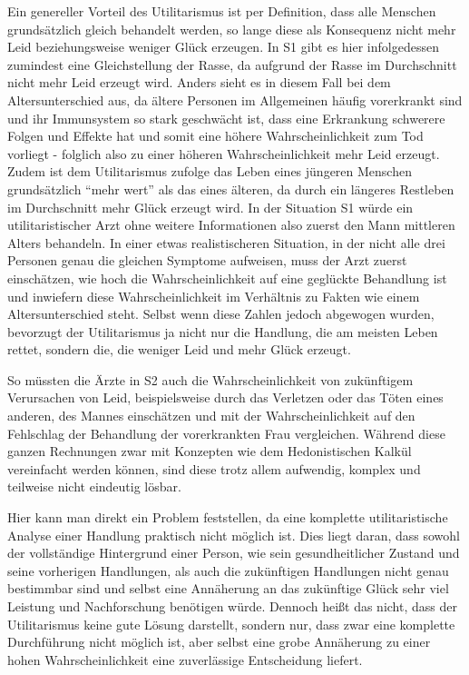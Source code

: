 \documentclass[a4paper]{article}
\begin{document}
Ein genereller Vorteil des Utilitarismus ist per Definition, dass alle Menschen grundsätzlich gleich behandelt werden, so lange diese als Konsequenz nicht mehr Leid beziehungsweise weniger Glück erzeugen. In S1 gibt es hier infolgedessen zumindest eine Gleichstellung der Rasse, da aufgrund der Rasse im Durchschnitt nicht mehr Leid erzeugt wird. Anders sieht es in diesem Fall bei dem Altersunterschied aus, da ältere Personen im Allgemeinen häufig vorerkrankt sind und ihr Immunsystem so stark geschwächt ist, dass eine Erkrankung schwerere Folgen und Effekte hat und somit eine höhere Wahrscheinlichkeit zum Tod vorliegt - folglich also zu einer höheren Wahrscheinlichkeit mehr Leid erzeugt. Zudem ist dem Utilitarismus zufolge das Leben eines jüngeren Menschen grundsätzlich \enquote{mehr wert} als das eines älteren, da durch ein längeres Restleben im Durchschnitt mehr Glück erzeugt wird. In der Situation S1 würde ein utilitaristischer Arzt ohne weitere Informationen also zuerst den Mann mittleren Alters behandeln. In einer etwas realistischeren Situation, in der nicht alle drei Personen genau die gleichen Symptome aufweisen, muss der Arzt zuerst einschätzen, wie hoch die Wahrscheinlichkeit auf eine geglückte Behandlung ist und inwiefern diese Wahrscheinlichkeit im Verhältnis zu Fakten wie einem Altersunterschied steht. Selbst wenn diese Zahlen jedoch abgewogen wurden, bevorzugt der Utilitarismus ja nicht nur die Handlung, die am meisten Leben rettet, sondern die, die weniger Leid und mehr Glück erzeugt.

So müssten die Ärzte in S2 auch die Wahrscheinlichkeit von zukünftigem Verursachen von Leid, beispielsweise durch das Verletzen oder das Töten eines anderen, des Mannes einschätzen und mit der Wahrscheinlichkeit auf den Fehlschlag der Behandlung der vorerkrankten Frau vergleichen. Während diese ganzen Rechnungen zwar mit Konzepten wie dem Hedonistischen Kalkül vereinfacht werden können, sind diese trotz allem aufwendig, komplex und teilweise nicht eindeutig lösbar.

Hier kann man direkt ein Problem feststellen, da eine komplette utilitaristische Analyse einer Handlung praktisch nicht möglich ist. Dies liegt daran, dass sowohl der vollständige Hintergrund einer Person, wie sein gesundheitlicher Zustand und seine vorherigen Handlungen, als auch die zukünftigen Handlungen nicht genau bestimmbar sind und selbst eine Annäherung an das zukünftige Glück sehr viel Leistung und Nachforschung benötigen würde. Dennoch heißt das nicht, dass der Utilitarismus keine gute Lösung darstellt, sondern nur, dass zwar eine komplette Durchführung nicht möglich ist, aber selbst eine grobe Annäherung zu einer hohen Wahrscheinlichkeit eine zuverlässige Entscheidung liefert.
\end{document}
